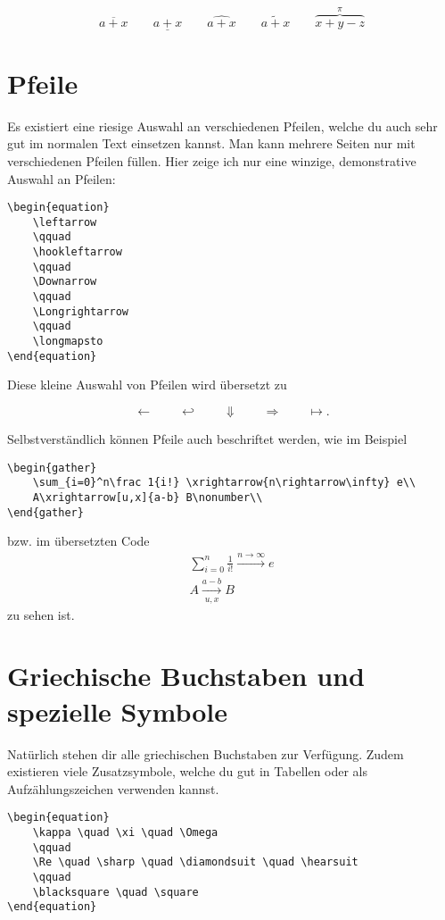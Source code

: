 \begin{equation}
	\overline{ a + x }
	\qquad
	\underline{ a + x }
	\qquad
	\widehat{ a + x }
	\qquad
	\widetilde{ a + x }
	\qquad
	\overbrace{ x + y - z }^{\pi}
\end{equation}

\section{Pfeile}

Es existiert eine riesige Auswahl an verschiedenen Pfeilen, welche du auch sehr gut im normalen Text einsetzen kannst. Man kann mehrere Seiten nur mit verschiedenen Pfeilen füllen. Hier zeige ich nur eine winzige, demonstrative Auswahl an Pfeilen:
\begin{lstlisting}
\begin{equation}
	\leftarrow
	\qquad
	\hookleftarrow
	\qquad
	\Downarrow
	\qquad
	\Longrightarrow
	\qquad
	\longmapsto
\end{equation}
\end{lstlisting} 

Diese kleine Auswahl von Pfeilen wird übersetzt zu

\begin{equation}
	\leftarrow
	\qquad
	\hookleftarrow
	\qquad
	\Downarrow
	\qquad
	\Longrightarrow
	\qquad
	\longmapsto.
\end{equation}

Selbstverständlich können Pfeile auch beschriftet werden, wie im Beispiel
\begin{lstlisting}
\begin{gather}
	\sum_{i=0}^n\frac 1{i!} \xrightarrow{n\rightarrow\infty} e\\
	A\xrightarrow[u,x]{a-b} B\nonumber\\
\end{gather}
\end{lstlisting}
bzw. im übersetzten Code
\begin{gather}
	\sum_{i=0}^n\frac 1{i!} \xrightarrow{n\rightarrow\infty} e\\
	A\xrightarrow[u,x]{a-b} B\nonumber
\end{gather}
zu sehen ist.

\section{Griechische Buchstaben und spezielle Symbole}

Natürlich stehen dir alle griechischen Buchstaben zur Verfügung. Zudem existieren viele Zusatzsymbole, welche du gut in Tabellen oder als Aufzählungszeichen verwenden kannst.
\begin{lstlisting}
\begin{equation}
	\kappa \quad \xi \quad \Omega
	\qquad
	\Re \quad \sharp \quad \diamondsuit \quad \hearsuit
	\qquad
	\blacksquare \quad \square 
\end{equation}
\end{lstlisting} 


